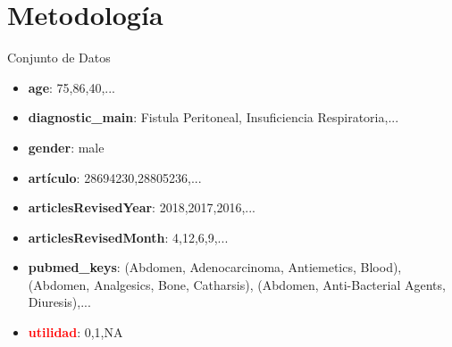 \documentclass[10pt]{beamer}
\begin{document}
\section{Metodología}
 
\begin{frame}{Conjunto de Datos}
  \begin{itemize}
    \item \textbf{age}: 75,86,40,...
    \item \textbf{diagnostic\_main}: Fistula Peritoneal, Insuficiencia Respiratoria,...
    \item \textbf{gender}: male
    \item \textbf{artículo}: 28694230,28805236,...
    \item \textbf{articlesRevisedYear}: 2018,2017,2016,...
    \item \textbf{articlesRevisedMonth}: 4,12,6,9,...
    \item \textbf{pubmed\_keys}: (Abdomen, Adenocarcinoma, Antiemetics, Blood), (Abdomen, Analgesics, Bone, Catharsis), (Abdomen, Anti-Bacterial Agents, Diuresis),...
    \item \textcolor{red}{\textbf{utilidad}}: 0,1,NA
  \end{itemize}
\end{frame}
 
\end{document}
